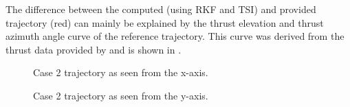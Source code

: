 \noindent
The difference between the computed (using \ac{RKF} and \ac{TSI}) and provided trajectory (red) can mainly be explained by the thrust elevation and thrust azimuth angle curve of the reference trajectory. This curve was derived from the thrust data provided by \cite{benito2016trajectory} and is shown in . 





\begin{figure}[H]
\centering
{}
\caption{Case 2 trajectory as seen from the x-axis.}
\label{fig:2PlotFigure1SeenFromXaxisZoom}
\end{figure}

\begin{figure}[H]
\centering
{}
\caption{Case 2 trajectory as seen from the y-axis.}
\label{fig:2PlotFigure1SeenFromYaxisZoom}
\end{figure}

